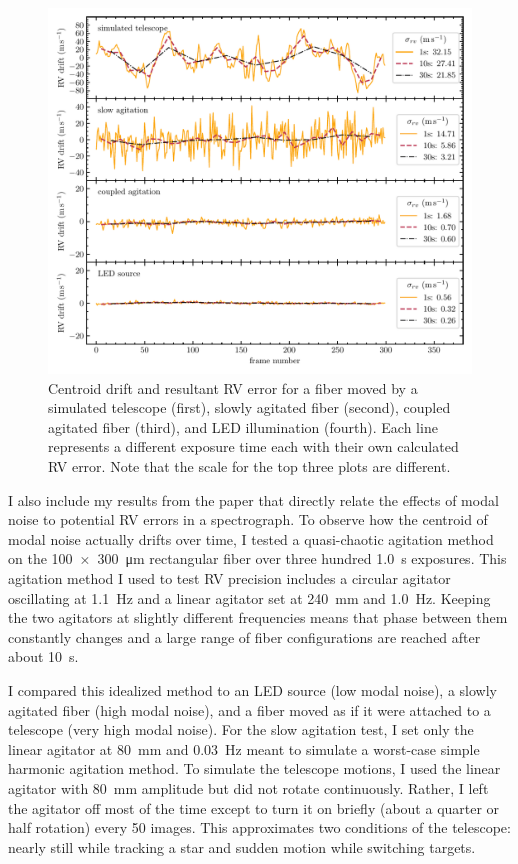 \documentclass[11pt]{article}
\begin{document}
\begin{figure}
\centering
	\includegraphics[width=\textwidth]{images/rv_error.pdf}
	\caption{Centroid drift and resultant RV error for a fiber moved by a simulated telescope (first), slowly agitated fiber (second), coupled agitated fiber (third), and LED illumination (fourth). Each line represents a different exposure time each with their own calculated RV error. Note that the scale for the top three plots are different.}
\label{fig:rv_error}
\end{figure}

I also include my results from the paper that directly relate the effects of modal noise to potential RV errors in a spectrograph. To observe how the centroid of modal noise actually drifts over time, I tested a quasi-chaotic agitation method on the \SI{100x300}{\micro\meter} rectangular fiber over three hundred \SI{1.0}{\second} exposures. This agitation method I used to test RV precision includes a circular agitator oscillating at \SI{1.1}{\hertz} and a linear agitator set at \SI{240}{\milli\meter} and \SI{1.0}{\hertz}. Keeping the two agitators at slightly different frequencies means that phase between them constantly changes and a large range of fiber configurations are reached after about \SI{10}{\second}.

I compared this idealized method to an LED source (low modal noise), a slowly agitated fiber (high modal noise), and a fiber moved as if it were attached to a telescope (very high modal noise). For the slow agitation test, I set only the linear agitator at \SI{80}{\milli\meter} and \SI{0.03}{\hertz} meant to simulate a worst-case simple harmonic agitation method. To simulate the telescope motions, I used the linear agitator with \SI{80}{\milli\meter} amplitude but did not rotate continuously. Rather, I left the agitator off most of the time except to turn it on briefly (about a quarter or half rotation) every 50 images. This approximates two conditions of the telescope: nearly still while tracking a star and sudden motion while switching targets.
\end{document}
